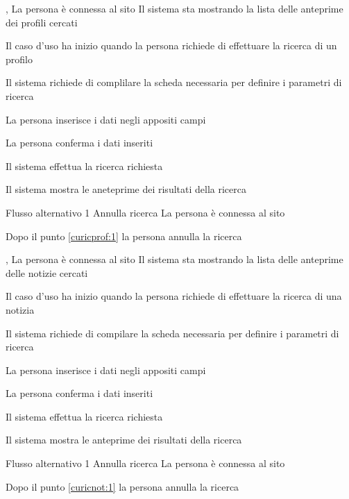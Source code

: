 
{, }
{La persona è connessa al sito}
{Il sistema sta mostrando la lista delle anteprime dei profili cercati}
{\begin{enumCU}
	\item Il caso d'uso ha inizio quando la persona richiede di effettuare la ricerca di un profilo
	\item Il sistema richiede di complilare la scheda necessaria per definire i parametri di ricerca
	\item La persona inserisce i dati negli appositi campi \label{curicprof:1}
	\item La persona conferma i dati inseriti
	\item Il sistema effettua la ricerca richiesta
	\item Il sistema mostra le aneteprime dei risultati della ricerca
\end{enumCU}
}
%
{Flusso alternativo 1}%
{Annulla ricerca}%
{La persona è connessa al sito}%
{\postNulle}%
{\begin{enumCU}
		\item Dopo il punto \ref{curicprof:1} la persona annulla la ricerca
	\end{enumCU}}%



{, }
{La persona è connessa al sito}
{Il sistema sta mostrando la lista delle anteprime delle notizie cercati}
{\begin{enumCU}
	\item Il caso d'uso ha inizio quando la persona richiede di effettuare la ricerca di una notizia
	\item Il sistema richiede di compilare la scheda necessaria per definire i parametri di ricerca
	\item La persona inserisce i dati negli appositi campi \label{curicnot:1}
	\item La persona conferma i dati inseriti
	\item Il sistema effettua la ricerca richiesta
	\item Il sistema mostra le anteprime dei risultati della ricerca
\end{enumCU}
}
%
{Flusso alternativo 1}%
{Annulla ricerca}%
{La persona è connessa al sito}%
{\postNulle}%
{\begin{enumCU}
		\item Dopo il punto \ref{curicnot:1} la persona annulla la ricerca
	\end{enumCU}}%



